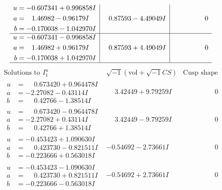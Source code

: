 \documentclass[1p]{elsarticle_modified}
\theoremstyle{definition}
\newcommand{\I}{\sqrt{-1}}
\begin{document}
$$\begin{array}{c|c|c}
\begin{aligned}
u &= -0.607341 + 0.996858 I \\
a &= \phantom{-}1.46982 - 0.96179 I \\
b &= -0.170038 - 1.042970 I\end{aligned}
 & \phantom{-}0.87593 - 4.49049 I & \phantom{-0.000000 } 0 \\ \hline\begin{aligned}
u &= -0.607341 - 0.996858 I \\
a &= \phantom{-}1.46982 + 0.96179 I \\
b &= -0.170038 + 1.042970 I\end{aligned}
 & \phantom{-}0.87593 + 4.49049 I & \phantom{-0.000000 } 0\\
 \hline 
 \end{array}$$\newpage$$\begin{array}{c|c|c}  
\text{Solutions to }I^u_{1}& \I (\text{vol} + \sqrt{-1}CS) & \text{Cusp shape}\\
 \hline 
\begin{aligned}
u &= \phantom{-}0.673420 + 0.964478 I \\
a &= -2.27082 - 0.43114 I \\
b &= \phantom{-}0.42766 - 1.38514 I\end{aligned}
 & \phantom{-}3.42449 + 9.79259 I & \phantom{-0.000000 } 0 \\ \hline\begin{aligned}
u &= \phantom{-}0.673420 - 0.964478 I \\
a &= -2.27082 + 0.43114 I \\
b &= \phantom{-}0.42766 + 1.38514 I\end{aligned}
 & \phantom{-}3.42449 - 9.79259 I & \phantom{-0.000000 } 0 \\ \hline\begin{aligned}
u &= -0.453423 + 1.090630 I \\
a &= \phantom{-}0.423730 - 0.821511 I \\
b &= -0.223666 + 0.563018 I\end{aligned}
 & -0.54692 - 2.73661 I & \phantom{-0.000000 } 0 \\ \hline\begin{aligned}
u &= -0.453423 - 1.090630 I \\
a &= \phantom{-}0.423730 + 0.821511 I \\
b &= -0.223666 - 0.563018 I\end{aligned}
 & -0.54692 + 2.73661 I & \phantom{-0.000000 } 0 \\ \hline\begin{aligned}

\end{aligned}
\end{array}$$
\end{document}
